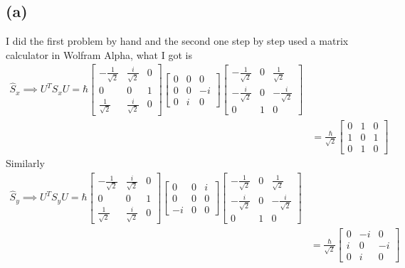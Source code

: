 \documentclass[letter]{article}
\newcommand{\hb}{\hbar}
\begin{document}
\subsection*{(a)} 
I did the first problem by hand and the second one step by step used a matrix calculator in Wolfram Alpha, what I got is
\begin{align*}
	\hat{S}_x \implies U^{T} S_x U =
\hb 	\begin{bmatrix} 
	-\frac{1}{\sqrt{2} } & \frac{i}{\sqrt{2} } & 0 \\ 
	0 & 0 & 1 \\ 
	\frac{1}{\sqrt{2} }& \frac{i}{\sqrt{2} } & 0 
	\end{bmatrix}  
	\begin{bmatrix} 0 & 0 & 0 \\ 
	0 & 0 & -i \\ 
0 & i & 0 \end{bmatrix}  
		\begin{bmatrix} -\frac{1}{\sqrt{2} } & 0 & \frac{1}{\sqrt{2} } \\ 
		- \frac{i}{\sqrt{2} } & 0 & -\frac{i}{\sqrt{2} } \\ 
	0 & 1 & 0 \end{bmatrix}  \\ 
&= 
\frac{\hb}{\sqrt{2} } 
			\begin{bmatrix} 0&1&0\\1&0&1\\0&1&0 \end{bmatrix} 
\end{align*}
Similarly 
\begin{align*}
	\hat{S}_y \implies 
	U^{T} S_y U = 
\hb 	\begin{bmatrix} 
	-\frac{1}{\sqrt{2} } & \frac{i}{\sqrt{2} } & 0 \\ 
	0 & 0 & 1 \\ 
	\frac{1}{\sqrt{2} }& \frac{i}{\sqrt{2} } & 0 
	\end{bmatrix}   
	\begin{bmatrix} 0&0&i \\ 0&0&0 \\ -i&0&0 \end{bmatrix} 
		\begin{bmatrix} -\frac{1}{\sqrt{2} } & 0 & \frac{1}{\sqrt{2} } \\ 
		- \frac{i}{\sqrt{2} } & 0 & -\frac{i}{\sqrt{2} } \\ 
	0 & 1 & 0 \end{bmatrix}  \\  
						     &= \frac{\hb}{\sqrt{2} } 
			\begin{bmatrix} 0&-i&0 \\ i & 0 & -i \\ 0 & i & 0 \end{bmatrix} 
\end{align*}
\end{document}
